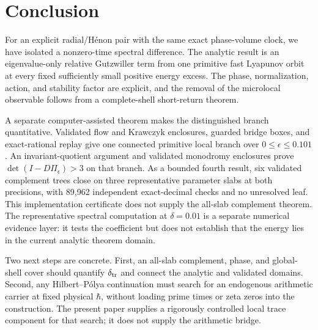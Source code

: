 \section{Conclusion}
\label{sec:conclusion}

For an explicit radial/H\'enon pair with the same exact phase-volume clock,
we have isolated a nonzero-time spectral difference.  The analytic result is
an eigenvalue-only relative Gutzwiller term from one primitive fast Lyapunov
orbit at every fixed sufficiently small positive energy excess.  The phase,
normalization, action, and stability factor are explicit, and the removal of
the microlocal observable follows from a complete-shell short-return
theorem.

A separate computer-assisted theorem makes the distinguished branch
quantitative.  Validated flow and Krawczyk enclosures, guarded bridge boxes,
and exact-rational replay give one connected primitive local branch over
\(0\le\epsilon\le0.101\).  An invariant-quotient argument and validated
monodromy enclosures prove \(\det(I-D\Pi_\epsilon)>3\) on that branch.
As a bounded fourth result, six validated complement trees close on three
representative parameter slabs at both precisions, with 89,962 independent
exact-decimal checks and no unresolved leaf.  This implementation certificate
does not supply the all-slab complement theorem.
The representative spectral computation at \(\delta=0.01\) is a separate
numerical evidence layer: it tests the coefficient but does not establish that the
energy lies in the current analytic theorem domain.

Two next steps are concrete.  First, an all-slab complement, phase, and
global-shell cover should quantify \(\delta_{\rm tr}\) and connect the
analytic and validated domains.  Second, any Hilbert--P\'olya continuation
must search for an endogenous arithmetic carrier at fixed physical
\(\hbar\), without loading prime times or zeta zeros into the construction.
The present paper supplies a rigorously controlled local trace component for
that search; it does not supply the arithmetic bridge.
